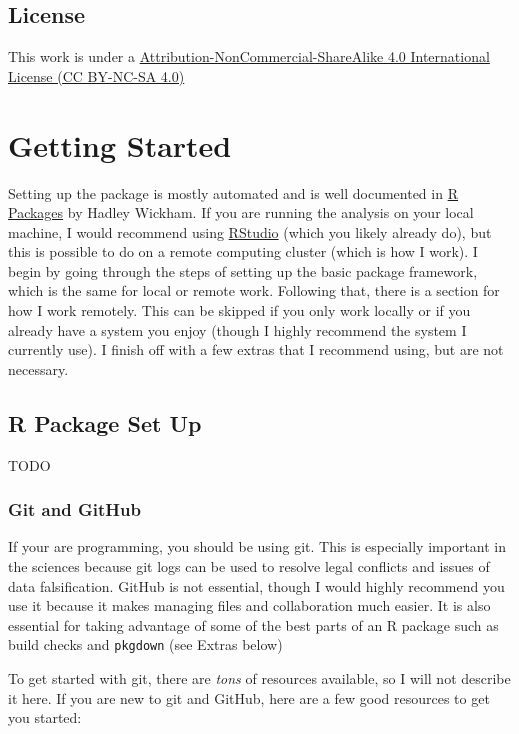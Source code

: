 \documentclass[]{book}
\begin{document}
\section*{License}\label{license}

This work is under a
\href{http://creativecommons.org/licenses/by-nc-sa/4.0/}{Attribution-NonCommercial-ShareAlike
4.0 International License (CC BY-NC-SA 4.0)}

\chapter{Getting Started}\label{getting-started}

Setting up the package is mostly automated and is well documented in
\href{http://r-pkgs.had.co.nz/intro.html}{R Packages} by Hadley Wickham.
If you are running the analysis on your local machine, I would recommend
using \href{https://www.rstudio.com}{RStudio} (which you likely already
do), but this is possible to do on a remote computing cluster (which is
how I work). I begin by going through the steps of setting up the basic
package framework, which is the same for local or remote work. Following
that, there is a section for how I work remotely. This can be skipped if
you only work locally or if you already have a system you enjoy (though
I highly recommend the system I currently use). I finish off with a few
extras that I recommend using, but are not necessary.

\section{R Package Set Up}\label{r-package-set-up}

TODO

\subsection{Git and GitHub}\label{git-and-github}

If your are programming, you should be using git. This is especially
important in the sciences because git logs can be used to resolve legal
conflicts and issues of data falsification. GitHub is not essential,
though I would highly recommend you use it because it makes managing
files and collaboration much easier. It is also essential for taking
advantage of some of the best parts of an R package such as build checks
and \texttt{pkgdown} (see Extras below)

To get started with git, there are \emph{tons} of resources available,
so I will not describe it here. If you are new to git and GitHub, here
are a few good resources to get you started:
\end{document}
